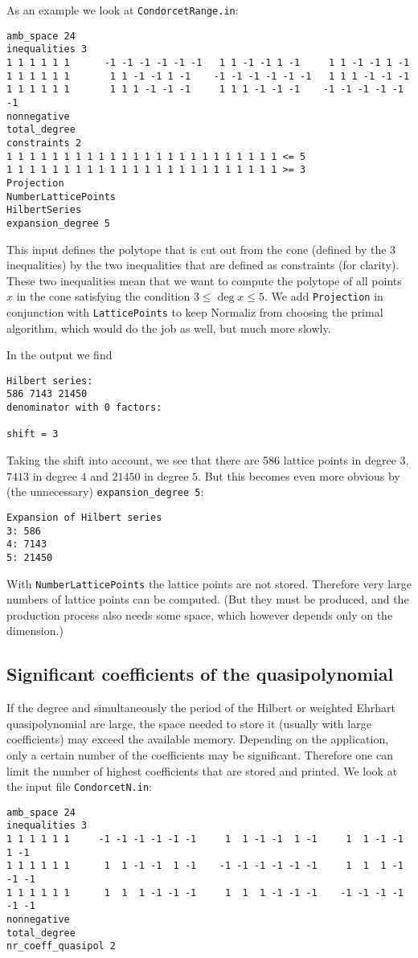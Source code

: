 \documentclass[12pt,a4paper]{scrartcl}
\theoremstyle{definition}
\begin{document}
{As an example we look at \verb|CondorcetRange.in|:
\begin{Verbatim}
amb_space 24
inequalities 3
1 1 1 1 1 1      -1 -1 -1 -1 -1 -1   1 1 -1 -1 1 -1     1 1 -1 -1 1 -1
1 1 1 1 1 1       1 1 -1 -1 1 -1    -1 -1 -1 -1 -1 -1   1 1 1 -1 -1 -1
1 1 1 1 1 1       1 1 1 -1 -1 -1     1 1 1 -1 -1 -1    -1 -1 -1 -1 -1 -1
nonnegative
total_degree
constraints 2
1 1 1 1 1 1 1 1 1 1 1 1 1 1 1 1 1 1 1 1 1 1 1 1 <= 5
1 1 1 1 1 1 1 1 1 1 1 1 1 1 1 1 1 1 1 1 1 1 1 1 >= 3
Projection
NumberLatticePoints
HilbertSeries
expansion_degree 5
\end{Verbatim}
This input defines the polytope that is cut out from the cone (defined by the $3$ inequalities) by the two inequalities that are defined as constraints (for clarity). These two inequalities mean that we want to compute the polytope of all points $x$ in the cone satisfying the condition $3\le \deg x \le 5$. We add \verb|Projection| in conjunction with \verb|LatticePoints| to keep Normaliz from choosing the primal algorithm, which would do the job as well, but much more slowly.

In the output we find
\begin{Verbatim}
Hilbert series:
586 7143 21450 
denominator with 0 factors:

shift = 3
\end{Verbatim}

Taking the shift into account, we see that there are 586 lattice points in degree $3$, $7413$ in degree $4$ and $21450$ in degree $5$. But this becomes even more obvious by (the unnecessary) \verb|expansion_degree 5|:
\begin{Verbatim}
Expansion of Hilbert series
3: 586
4: 7143
5: 21450
\end{Verbatim}
With \verb|NumberLatticePoints| the lattice points are not stored. Therefore very large numbers of lattice points can be computed.  (But they must be produced, and the production process also needs some space, which however depends only on the dimension.)


\subsection{Significant coefficients of the quasipolynomial}\label{highest_coeff}

If the degree and simultaneously the period of the Hilbert or weighted Ehrhart quasipolynomial are large, the space needed to store it (usually with large coefficients) may exceed the available memory. Depending on the application, only a certain number of the coefficients may be significant. Therefore one can limit the number of highest coefficients that are stored and printed. We look at the input file \texttt{CondorcetN.in}:
\begin{Verbatim}
amb_space 24
inequalities 3
1 1 1 1 1 1     -1 -1 -1 -1 -1 -1     1  1 -1 -1  1 -1     1  1 -1 -1  1 -1
1 1 1 1 1 1      1  1 -1 -1  1 -1    -1 -1 -1 -1 -1 -1     1  1  1 -1 -1 -1
1 1 1 1 1 1      1  1  1 -1 -1 -1     1  1  1 -1 -1 -1    -1 -1 -1 -1 -1 -1
nonnegative
total_degree
nr_coeff_quasipol 2
\end{Verbatim}

}
\end{document}
